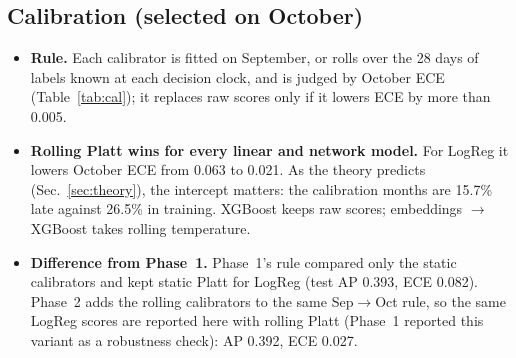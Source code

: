 \documentclass[conference]{IEEEtran}
\newcommand{\tabsize}{\footnotesize}
\begin{document}
\subsection{Calibration (selected on October)}
\begin{itemize}
\item \textbf{Rule.} Each calibrator is fitted on September, or rolls over the 28 days of labels known at each decision clock, and is judged by October ECE (Table~\ref{tab:cal}); it replaces raw scores only if it lowers ECE by more than 0.005.
\item \textbf{Rolling Platt wins for every linear and network model.} For LogReg it lowers October ECE from 0.063 to 0.021. As the theory predicts (Sec.~\ref{sec:theory}), the intercept matters: the calibration months are 15.7\% late against 26.5\% in training. XGBoost keeps raw scores; embeddings $\rightarrow$ XGBoost takes rolling temperature.
\item \textbf{Difference from Phase~1.} Phase~1's rule compared only the static calibrators and kept static Platt for LogReg (test AP 0.393, ECE 0.082). Phase~2 adds the rolling calibrators to the same Sep$\rightarrow$Oct rule, so the same LogReg scores are reported here with rolling Platt (Phase~1 reported this variant as a robustness check): AP 0.392, ECE 0.027.
\end{itemize}

\begin{table}[!t]
\caption{October ECE of every calibrator (fitted on September or rolling over 28 days of known labels). The rule picks the lowest, if it beats raw by more than 0.005.}
\label{tab:cal}
\centering\tabsize

\end{table}
\end{document}
